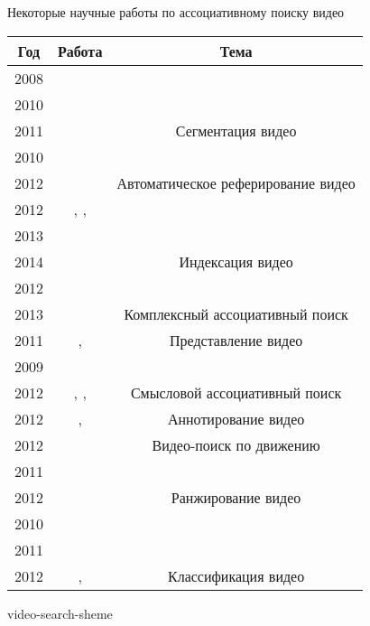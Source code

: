 \begin{dtable}{Некоторые научные работы по ассоциативному поиску видео}

    \renewcommand{\arraystretch}{1.4}

    \begin{tabular}{|c|c|c|}
        \hline
            Год
            & Работа
            & Тема
        \\
        \hline
        \hline
            2008 & \cite{Haase:95} & \\
            2010 & \cite{Smeaton:2010} & \\
            2011 & \cite{Kumar:2011}
            & \multirow{-3}{*}{Сегментация видео}
        \\
        \hline
            2010 & \cite{Fu:2010} & \\
            2012 & \cite{Wang:2012}
            & \multirow{-2}{*}{Автоматическое реферирование видео}
        \\
        \hline
            2012 & \cite{Chen:2012}, \cite{Zha:2012}, \cite{Wu:2012} & \\
            2013 & \cite{Paul:2013} & \\
            2014 & \cite{Nabeel:2014}
            & \multirow{-3}{*}{Индексация видео}
        \\
        \hline
            2012 & \cite{Huurnink:2012} & \\
            2013 & \cite{Tamizharasan:2013}
            & \multirow{-2}{*}{Комплексный ассоциативный поиск}
        \\
        \hline
            2011
            & \cite{Karpenko:2011}, \cite{Xiangang:2011}
            & Представление видео
        \\
        \hline
            2009 & \cite{Snoek:2009} & \\
            2012 & \cite{Jiang:2012}, \cite{Yu:2012}, \cite{Andre:2012}
            & \multirow{-2}{*}{Смысловой ассоциативный поиск}
        \\
        \hline
            2012
            & \cite{Zhang:2012}, \cite{Yu:2012}
            & Аннотирование видео
        \\
        \hline
            2012
            & \cite{Wei-Ta:2012}
            & Видео-поиск по движению
        \\
        \hline
            2011 & \cite{XinmieTian:2011} & \\
            2012 & \cite{Zhang:2012}
            & \multirow{-2}{*}{Ранжирование видео}
        \\
        \hline
            2010 & \cite{Tahayna:2010} & \\
            2011 & \cite{Sargin:2011} & \\
            2012 & \cite{JaeDeok:2012}, \cite{Ionescu:2012}
            & \multirow{-3}{*}{Классификация видео}
        \\
        \hline
    \end{tabular}
\end{dtable}


\pagebreak


\begin{figuredt}
    {video-search-sheme}
\end{figuredt}


